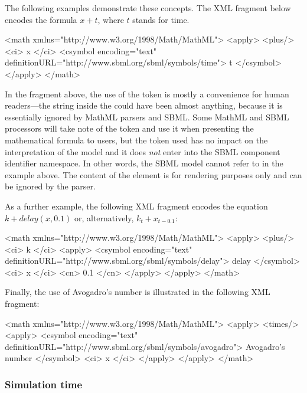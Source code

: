 The following examples demonstrate these concepts.  The XML fragment below
encodes the formula $x + t$, where $t$ stands for time.

\begin{example}
<math xmlns="http://www.w3.org/1998/Math/MathML">
    <apply>
        <plus/>
        <ci> x </ci>
        <csymbol encoding="text" definitionURL="http://www.sbml.org/sbml/symbols/time">
            t
        </csymbol>
    </apply>
</math>
\end{example}

In the fragment above, the use of the token  is mostly a
convenience for human readers---the string inside the
 could have been almost anything, because it is
essentially ignored by MathML parsers and SBML.  Some MathML and
SBML processors will take note of the token and use it when
presenting the mathematical formula to users, but the token used
has no impact on the interpretation of the model and it does
\emph{not} enter into the SBML component identifier namespace.  In
other words, the SBML model cannot refer to  in the
example above.  The content of the  element is for
rendering purposes only and can be ignored by the parser.

As a further example, the following XML fragment encodes the equation
$k + delay(x, 0.1)$ or, alternatively, $k_t + x_{t - 0.1}$:

\begin{example}

<math xmlns="http://www.w3.org/1998/Math/MathML">
    <apply>
        <plus/>
        <ci> k </ci>
        <apply>
            <csymbol encoding="text" definitionURL="http://www.sbml.org/sbml/symbols/delay">
                delay
            </csymbol>
            <ci> x </ci>
            <cn> 0.1 </cn>
        </apply>
    </apply>
</math>
\end{example}

Finally, the use of Avogadro's number is illustrated in the
following XML fragment:

\begin{example}
<math xmlns="http://www.w3.org/1998/Math/MathML">
    <apply>
        <times/>
        <apply>
            <csymbol encoding="text" definitionURL="http://www.sbml.org/sbml/symbols/avogadro">
                Avogadro's number
            </csymbol>
            <ci> x </ci>
        </apply>
    </apply>
</math>
\end{example}


\subsubsection{Simulation time}
\label{sec:meaning-of-time}

